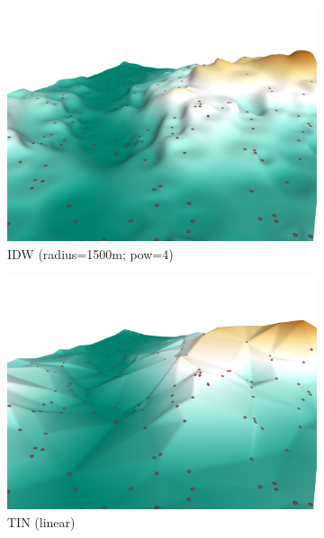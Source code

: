 \begin{figure}
\begin{subfigure}[b]{0.41\linewidth}
    \includegraphics{figs/results/idw_r1500_p4.png}
    \caption{IDW (radius=1500m; pow=4)}
  \end{subfigure}  
  \quad
  \begin{subfigure}[b]{0.41\linewidth}
    \centering
    \includegraphics{figs/results/tin.png}
    \caption{TIN (linear)}
  \end{subfigure}
  \quad
  \begin{subfigure}[b]{0.41\linewidth}
    \centering

\end{subfigure}
\end{figure}
